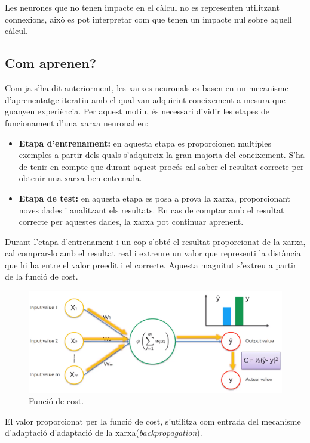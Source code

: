 \documentclass[12pt]{article}
\begin{document}
\\\\Les neurones que no tenen impacte en el càlcul no es representen utilitzant connexions, això es pot interpretar com que tenen un impacte nul sobre aquell càlcul.

\clearpage
\subsection{Com aprenen?}
Com ja s'ha dit anteriorment, les xarxes neuronals es basen en un mecanisme d'aprenentatge iteratiu amb el qual van adquirint coneixement a mesura que guanyen experiència. Per aquest motiu, és necessari dividir les etapes de funcionament d'una xarxa neuronal en:
\begin{itemize}
	\item \textbf{Etapa d'entrenament:} en aquesta etapa es proporcionen multiples exemples a partir dels quals s'adquireix la gran majoria del coneixement. S'ha de tenir en compte que durant aquest procés cal saber el resultat correcte per obtenir una xarxa ben entrenada.
	\item \textbf{Etapa de test:} en aquesta etapa es posa a prova la xarxa, proporcionant noves dades i analitzant els resultats. En cas de comptar amb el resultat correcte per aquestes dades, la xarxa pot continuar aprenent.
\end{itemize}
Durant l'etapa d'entrenament i un cop s'obté el resultat proporcionat de la xarxa, cal comprar-lo amb el resultat real i extreure un valor que representi la distància que hi ha entre el valor preedit i el correcte. Aquesta magnitut s'extreu a partir de la funció de cost. 
\begin{figure}[h!]
	\centering
	\includegraphics[scale=0.3]{imatges/aprendre/1aprendre.png}
	\caption{Funció de cost.}
\end{figure}
El valor proporcionat per la funció de cost, s'utilitza com entrada del mecanisme d'adaptació d'adaptació de la xarxa(\textit{backpropagation}).
\end{document}
